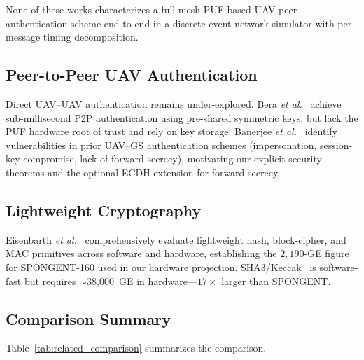 \documentclass[journal,a4paper,10pt]{IEEEtran}
\begin{document}
None of these works characterizes a full-mesh PUF-based UAV
peer-authentication scheme end-to-end in a discrete-event network
simulator with per-message timing decomposition.

\subsection{Peer-to-Peer UAV Authentication}
Direct UAV--UAV authentication remains under-explored. Bera \textit{et
al.}~\cite{peer2peer_auth} achieve sub-millisecond P2P authentication
using pre-shared symmetric keys, but lack the PUF hardware root of
trust and rely on key storage. Banerjee \textit{et
al.}~\cite{puf_uav_security_analysis} identify vulnerabilities in
prior UAV--GS authentication schemes (impersonation, session-key
compromise, lack of forward secrecy), motivating our explicit security
theorems and the optional ECDH extension for forward secrecy.

\subsection{Lightweight Cryptography}
Eisenbarth \textit{et al.}~\cite{lightweight_crypto_evaluation}
comprehensively evaluate lightweight hash, block-cipher, and MAC
primitives across software and hardware, establishing the
$2{,}190$-GE figure for SPONGENT-160 used in our hardware projection.
SHA3/Keccak~\cite{sha3_standard} is software-fast but requires
$\sim$38{,}000~GE in hardware---$17\times$ larger than SPONGENT.

\subsection{Comparison Summary}
Table~\ref{tab:related_comparison} summarizes the comparison.
\end{document}
